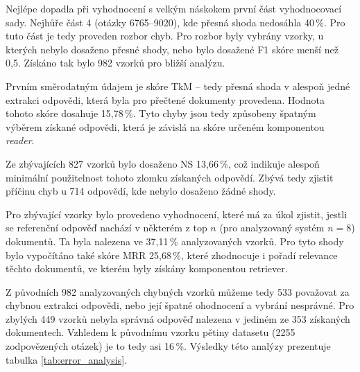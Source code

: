 Nejlépe dopadla při vyhodnocení s velkým náskokem první část vyhodnocovací sady. Nejhůře část 4 (otázky 6765--9020), kde přesná shoda nedosáhla 40\,\%. Pro tuto část je tedy proveden rozbor chyb. Pro rozbor byly vybrány vzorky, u kterých nebylo dosaženo přesné shody, nebo bylo dosažené F1 skóre menší než 0,5. Získáno tak bylo 982 vzorků pro bližší analýzu.\par
Prvním směrodatným údajem je skóre TkM -- tedy přesná shoda v alespoň jedné extrakci odpovědi, která byla pro přečtené dokumenty provedena. Hodnota tohoto skóre dosahuje 15,78\,\%. Tyto chyby jsou tedy způsobeny špatným výběrem získané odpovědi, která je závislá na skóre určeném komponentou \emph{reader}.\par
Ze zbývajících 827 vzorků bylo dosaženo NS 13,66\,\%, což indikuje alespoň minimální použitelnost tohoto zlomku získaných odpovědí. Zbývá tedy zjistit příčinu chyb u 714 odpovědí, kde nebylo dosaženo žádné shody.\par
Pro zbývající vzorky bylo provedeno vyhodnocení, které má za úkol zjistit, jestli se referenční odpověď nachází v některém z top $n$ (pro analyzovaný systém $n=8$) dokumentů. Ta byla nalezena ve 37,11\,\% analyzovaných vzorků. Pro tyto shody bylo vypočítáno také skóre MRR 25,68\,\%, které zhodnocuje i pořadí relevance těchto dokumentů, ve kterém byly získány komponentou retriever.\par
Z původních 982 analyzovaných chybných vzorků můžeme tedy 533 považovat za chybnou extrakci odpovědi, nebo její špatné ohodnocení a vybrání nesprávné. Pro zbylých 449 vzorků nebyla správná odpověď nalezena v jediném ze 353 získaných dokumentech. Vzhledem k původnímu vzorku pětiny datasetu (2255 zodpovězených otázek) je to tedy asi 16\,\%. Výsledky této analýzy prezentuje tabulka \ref{tab:error_analysis}.


